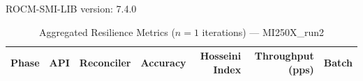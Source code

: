 ROCM-SMI-LIB version: 7.4.0

\begin{table}[htbp]
\caption{Aggregated Resilience Metrics ($n=1$ iterations) --- MI250X_run2}
\begin{tabular}{l l l r r r r}
\hline
Phase & API & Reconciler & Accuracy & Hosseini Index & Throughput (pps) & Batch \\
\hline
\hline
\end{tabular}
\end{table}
